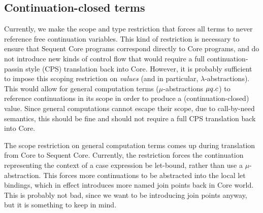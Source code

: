 \documentclass{article}
\begin{document}
\subsection{Continuation-closed terms}

Currently, we make the scope and type restriction that forces all terms to never
reference free continuation variables.  This kind of restriction is necessary to
ensure that Sequent Core programs correspond directly to Core programs, and do
not introduce new kinds of control flow that would require a full
continuation-passin style (CPS) translation back into Core.  However, it is
probably sufficient to impose this scoping restriction on \emph{values} (and in
particular, $\lambda$-abstractions).  This would allow for general computation
terms ($\mu$-abstractions $\mu{q}.c$) to reference continuations in its
scope in order to produce a (continuation-closed) value.  Since general
computations cannot escape their scope, due to call-by-need semantics, this
should be fine and should not require a full CPS translation back into Core.

The scope restriction on general computation terms comes up during translation
from Core to Sequent Core.  Currently, the restriction forces the continuation
representing the context of a case expression be let-bound, rather than use a
$\mu$-abstraction.  This forces more continuations to be abstracted into the
local let bindings, which in effect introduces more named join points back in
Core world.  This is probably not bad, since we want to be introducing join
points anyway, but it is something to keep in mind.
\end{document}
